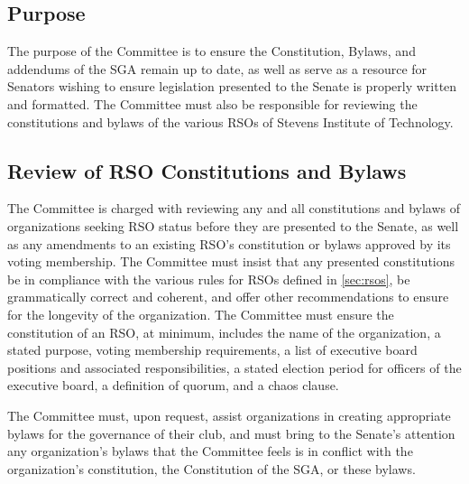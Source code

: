 \documentclass[12pt]{scrreprt}
\begin{document}
\subsection{Purpose}
The purpose of the Committee is to ensure the Constitution, Bylaws, and addendums of the SGA remain up
to date, as well as serve as a resource for Senators wishing to ensure legislation presented to the Senate is properly written and formatted. The Committee must also be responsible for reviewing the constitutions and bylaws of the various RSOs of Stevens Institute of Technology.

\subsection{Review of RSO Constitutions and Bylaws}
The Committee is charged with reviewing any and all constitutions and bylaws of organizations seeking RSO status before they are presented to the Senate, as well as any amendments to an existing RSO’s constitution or bylaws approved by its voting membership. The Committee must insist that any presented constitutions be in compliance with the various rules for RSOs defined in 
\ref{sec:rsos}, be grammatically correct and coherent, and offer other recommendations to ensure for the longevity of the organization. The Committee must ensure the constitution of an RSO, at minimum, includes the name of the organization, a stated purpose, voting membership requirements, a list of executive board positions and associated responsibilities, a stated election period for officers of the executive board, a definition of quorum, and a chaos clause.

The Committee must, upon request, assist organizations in creating appropriate bylaws for the governance of their club, and must bring to the Senate's attention any organization's bylaws
that the Committee feels is in conflict with the organization's constitution, the Constitution of
the SGA, or these bylaws.
\end{document}
